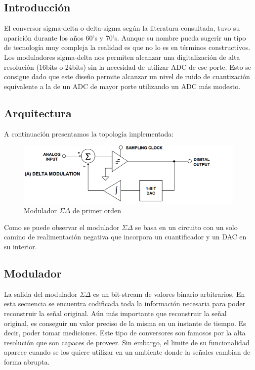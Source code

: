 
\subsection{Introducción}
El conversor sigma-delta o delta-sigma según la literatura consultada, tuvo su aparición durante los años 60's y 70's. Aunque su nombre pueda sugerir un tipo de tecnología muy compleja la realidad es que no lo es en términos constructivos. Los moduladores sigma-delta nos permiten alcanzar una digitalización de alta resolución (16bits o 24bits) sin la necesidad de utilizar ADC de ese porte. Esto se consigue dado que este diseño permite alcanzar un nivel de ruido de cuantización equivalente a la de un ADC de mayor porte utilizando un ADC más modesto.


\subsection{Arquitectura}

A continuación presentamos la topología implementada:

\begin{figure}[H]
	\centering
	\includegraphics[width=0.7\linewidth]{ImagenesEjercicio2/diagramaEnBloques}
	\caption{Modulador $\Sigma\Delta$ de primer orden}
	\label{fig:diagramaenbloques}
\end{figure}

Como se puede observar el modulador $\Sigma\Delta$ se basa en un circuito con un solo camino de realimentación negativa que incorpora un cuantificador y un DAC en su interior.



\subsection{Modulador}
La salida del modulador $\Sigma\Delta$ es un bit-stream de valores binario arbitrarios. En esta secuencia se encuentra codificada toda la información necesaria para poder reconstruir la señal original. Aún más importante que reconstruir la señal original, es conseguir un valor preciso de la misma en un instante de tiempo. Es decir, poder tomar mediciones. Este tipo de conversores son famosos por la alta resolución que son capaces de proveer. Sin embargo, el limite de su funcionalidad aparece cuando se los quiere utilizar en un ambiente donde la señales cambian de forma abrupta.

